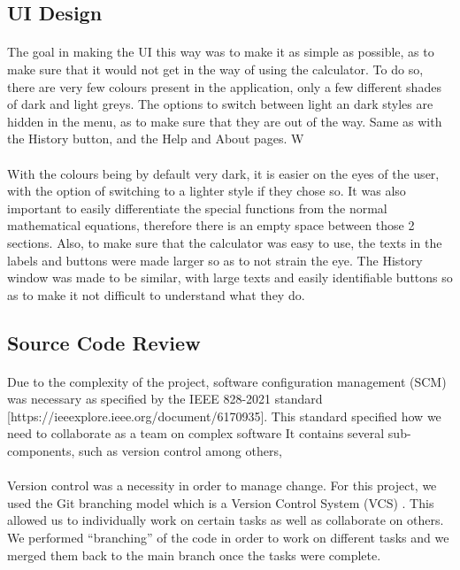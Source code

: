     \subsection{UI Design}
    \paragraph{}
    The goal in making the UI this way was to make it as simple as possible, as to make sure that it would not get in the way of using the calculator. To do so, there are very few colours present in the application, only a few different shades of dark and light greys. The options to switch between light an dark styles are hidden in the menu, as to make sure that they are out of the way. Same as with the History button, and the Help and About pages. W

    \paragraph{}
    With the colours being by default very dark, it is easier on the eyes of the user, with the option of switching to a lighter style if they chose so. It was also important to easily differentiate the special functions from the normal mathematical equations, therefore there is an empty space between those 2 sections. Also, to make sure that the calculator was easy to use, the texts in the labels and buttons were made larger so as to not strain the eye. The History window was made to be similar, with large texts and easily identifiable buttons so as to make it not difficult to understand what they do.


    \subsection{Source Code Review}
        \paragraph{}
        Due to the complexity of the project, software configuration management (SCM) was necessary as specified by the IEEE 828-2021 standard [https://ieeexplore.ieee.org/document/6170935]. This standard specified how we need to collaborate as a team on complex software It contains several sub-components, such as version control among others,

        \paragraph{}
        Version control  was a necessity in order to manage change. For this project, we used the Git branching model which is a Version Control System (VCS) . This allowed us to individually work on certain tasks as well as collaborate on others. We performed “branching” of the code in order to work on different tasks and we merged them back to the main branch once the tasks were complete.

